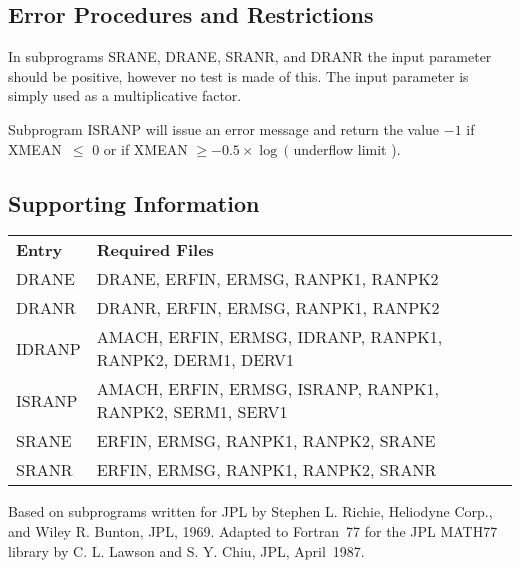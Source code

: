 \documentclass[twoside]{MATH77}
\begin{document}



\subsection{Error Procedures and Restrictions}

In subprograms SRANE, DRANE, SRANR, and DRANR the input parameter should be
positive, however no test is made of this. The input parameter is simply
used as a multiplicative factor.

Subprogram ISRANP will issue an error message and return the value $-1$ if
XMEAN\ $\leq $ 0 or if XMEAN $\geq -0.5\times \log \,($ underflow limit ).

\subsection{Supporting Information}

\begin{tabular}{@{\bf}l@{\hspace{5pt}}l}
\bf Entry & \hspace{.35in} {\bf Required Files}\vspace{2pt} \\
DRANE & \parbox[t]{2.7in}{ \raggedright
DRANE, ERFIN, ERMSG, RANPK1, RANPK2\rule[-5pt]{0pt}{8pt}}\\
DRANR & \parbox[t]{2.7in}{ \raggedright
DRANR, ERFIN, ERMSG, RANPK1, RANPK2\rule[-5pt]{0pt}{8pt}}\\
IDRANP & \parbox[t]{2.7in}{ \raggedright
AMACH, ERFIN, ERMSG, IDRANP, RANPK1, RANPK2, DERM1, DERV1\rule[-5pt]{0pt}{8pt}}\\
ISRANP & \parbox[t]{2.7in}{ \raggedright
AMACH, ERFIN, ERMSG, ISRANP, RANPK1, RANPK2, SERM1, SERV1\rule[-5pt]{0pt}{8pt}}\\
SRANE & \parbox[t]{2.7in}{ \raggedright
ERFIN, ERMSG, RANPK1, RANPK2, SRANE\rule[-5pt]{0pt}{8pt}}\\
SRANR & \parbox[t]{2.7in}{ \raggedright
ERFIN, ERMSG, RANPK1, RANPK2, SRANR}\\\end{tabular}

Based on subprograms written for JPL by Stephen L. Richie, Heliodyne Corp.,
and Wiley R. Bunton, JPL, 1969. Adapted to Fortran~77 for the JPL MATH77
library by C. L. Lawson and S. Y. Chiu, JPL, April~1987.
\end{document}

